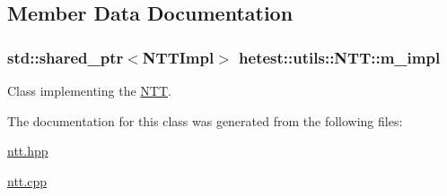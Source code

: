 \subsection{Member Data Documentation}
\hypertarget{classhetest_1_1utils_1_1NTT_ae2d7985d8380a7c30cb0ca745aa900f5}{
\subsubsection[{m\-\_\-impl}]{\setlength{\rightskip}{0pt plus 5cm}std\-::shared\-\_\-ptr$<${\bf N\-T\-T\-Impl}$>$ hetest\-::utils\-::\-N\-T\-T\-::m\-\_\-impl}}\label{classhetest_1_1utils_1_1NTT_ae2d7985d8380a7c30cb0ca745aa900f5}


Class implementing the \hyperlink{classhetest_1_1utils_1_1NTT}{N\-T\-T}. 



The documentation for this class was generated from the following files\-:\begin{DoxyCompactItemize}
\item 
\hyperlink{ntt_8hpp}{ntt.\-hpp}\item 
\hyperlink{ntt_8cpp}{ntt.\-cpp}\end{DoxyCompactItemize}
